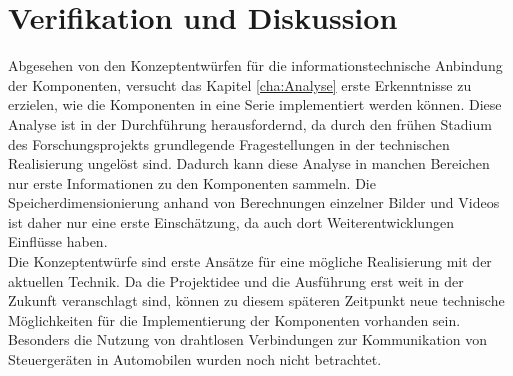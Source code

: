 \chapter{Verifikation und Diskussion}
\label{cha:Verifikation}
Abgesehen von den Konzeptentwürfen für die informationstechnische Anbindung der Komponenten, versucht das Kapitel \ref{cha:Analyse} erste Erkenntnisse zu erzielen, wie die Komponenten in eine Serie implementiert werden können. Diese Analyse ist in der Durchführung herausfordernd, da durch den frühen Stadium des Forschungsprojekts grundlegende Fragestellungen in der technischen Realisierung ungelöst sind. Dadurch kann diese Analyse in manchen Bereichen nur erste Informationen zu den Komponenten sammeln. Die Speicherdimensionierung anhand von Berechnungen einzelner Bilder und Videos ist daher nur eine erste Einschätzung, da auch dort Weiterentwicklungen Einflüsse haben.\\
Die Konzeptentwürfe sind erste Ansätze für eine mögliche Realisierung mit der aktuellen Technik. Da die Projektidee und die Ausführung erst weit in der Zukunft veranschlagt sind, können zu diesem späteren Zeitpunkt neue technische Möglichkeiten für die Implementierung der Komponenten vorhanden sein. Besonders die Nutzung von drahtlosen Verbindungen zur Kommunikation von Steuergeräten in Automobilen wurden noch nicht betrachtet. 

